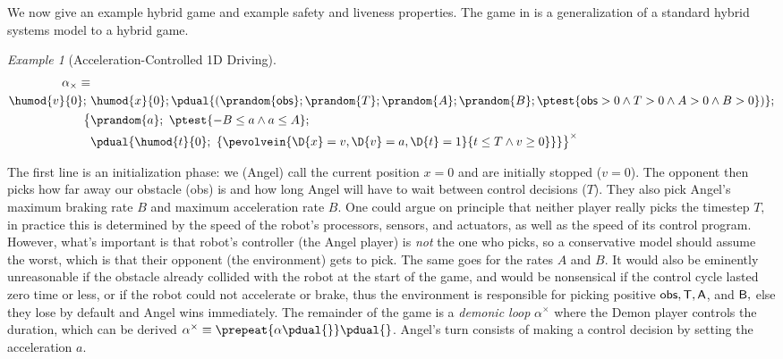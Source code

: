 \documentclass[12pt]{cmuthesis}
\theoremstyle{definition}
\theoremstyle{remark}
\newtheorem{example}{Example}
\newcommand{\obsvar}{{\sf obs}\xspace}
\newcommand{\Tvar}{{\sf T}\xspace}
\newcommand{\Avar}{{\sf A}\xspace}
\newcommand{\Bvar}{{\sf B}\xspace}
\newcommand{\rref}[2][]{\prettyref{#2}}
\begin{document}
We now give an example hybrid game and example safety and liveness properties.
The game in \rref{ex:driving-game} is a generalization of a standard hybrid systems model to a hybrid game.
\begin{example}[Acceleration-Controlled 1D Driving]
\label{ex:driving-game}
\begin{align}
\alpha_\times\equiv&\\
\label{eq:driving-init}\humod{v}{0};~&\humod{x}{0};\pdual{(\prandom{\obsvar};\prandom{T};\prandom{A};\prandom{B}; \ptest{\obsvar > 0 \land T > 0 \land A > 0 \land B > 0})};\\
\label{eq:driving-angel}\big\{ &\prandom{a};~\ptest{-B \leq a \land a \leq A};\\ 
\label{eq:driving-demon}       &\pdual{\humod{t}{0};~\{\pevolvein{\D{x}=v, \D{v}=a, \D{t}=1}{t \leq T \land v \geq 0}\}}\big\}^\times
\end{align}
\end{example}
The first line \rref{eq:driving-init} is an initialization phase: we (Angel) call the current position $x = 0$ and are initially stopped ($v = 0$).
The opponent then picks how far away our obstacle (\obsvar) is and how long Angel will have to wait between control decisions ($T$).
They also pick Angel's maximum braking rate $B$ and maximum acceleration rate $B$.
One could argue on principle that neither player really picks the timestep $T,$ in practice this is determined by the speed of the robot's processors, sensors, and actuators, as well as the speed of its control program.
However, what's important is that robot's controller (the Angel player) is \emph{not} the one who picks, so a conservative model should assume the worst, which is that their opponent (the environment) gets to pick.
The same goes for the rates $A$ and $B$.
It would also be eminently unreasonable if the obstacle already collided with the robot at the start of the game, and would be nonsensical if the control cycle lasted zero time or less, or if the robot could not accelerate or brake, thus the environment is responsible for picking positive $\obsvar, \Tvar, \Avar$, and  $\Bvar,$ else they lose by default and Angel wins immediately.
The remainder of the game is a \emph{demonic loop} $\alpha^\times$ where the Demon player controls the duration, which can be derived $\alpha^\times \equiv {\prepeat{{\alpha{}\pdual{}}}}{\pdual{}}$.
Angel's turn consists of making a control decision by setting the acceleration $a$.
\end{document}
